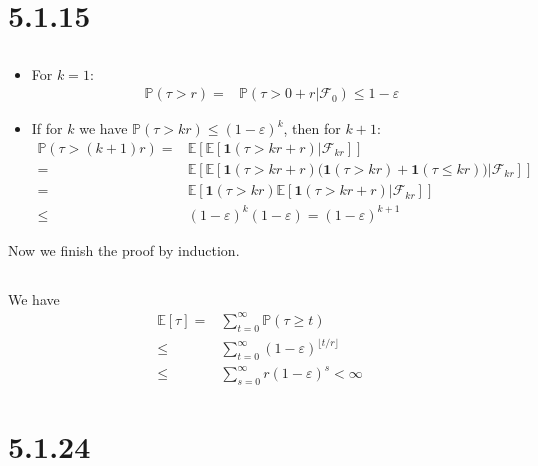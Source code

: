 \documentclass[11pt,a4paper]{ctexart}
\numberwithin{equation}{section}%
\newcommand{\F}{\mathcal{F}}
\begin{document}
\section{5.1.15}

\subsection{}

\begin{itemize}[topsep=2pt,itemsep=0pt]
    \item For $ k=1 $:
    \begin{align*}
        \mathbb{P}\left( \tau >r \right) =& \mathbb{P}\left( \tau >0+r|\F_0 \right) \leq 1-\varepsilon   
    \end{align*}
    \item If for $ k $ we have $ \mathbb{P}\left( \tau >kr \right) \leq (1-\varepsilon )^{k} $, then for $ k+1 $:
    \begin{align*}
        \mathbb{P}\left( \tau >(k+1)r \right) =& \mathbb{E}\left[ \mathbb{E}\left[ \mathbf{1}(\tau>kr+r) | \F_{kr} \right]  \right]\\
        =& \mathbb{E}\left[ \mathbb{E}\left[ \mathbf{1}(\tau>kr+r)\big( \mathbf{1}(\tau>kr) + \mathbf{1}(\tau\leq kr) \big) | \F_{kr} \right]  \right] \\
        =& \mathbb{E}\left[ \mathbf{1}(\tau>kr)\mathbb{E}\left[ \mathbf{1}(\tau>kr+r) | \F_{kr} \right]  \right] \\
        \leq & (1-\varepsilon )^k(1-\varepsilon ) = (1-\varepsilon )^{k+1}
    \end{align*}
\end{itemize}
Now we finish the proof by induction.

\subsection{}

We have
\begin{align*}
    \mathbb{E}\left[ \tau \right] =& \sum_{t=0}^\infty \mathbb{P}\left( \tau \geq t \right)   \\
    \leq& \sum_{t=0}^\infty (1-\varepsilon )^{\lfloor t/r \rfloor} \\
    \leq &\sum_{s=0}^\infty r(1-\varepsilon )^s <\infty 
\end{align*}


\section{5.1.24}
\end{document}
